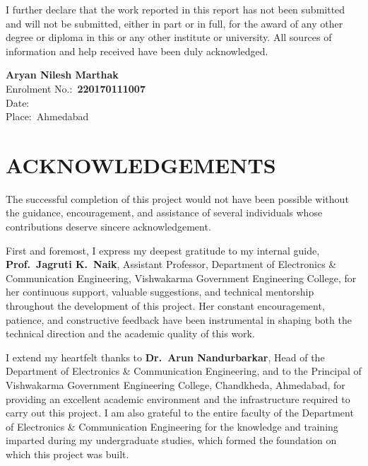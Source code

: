 \documentclass[12pt,a4paper,oneside]{report}
\begin{document}
I further declare that the work reported in this report has not been submitted
and will not be submitted, either in part or in full, for the award of any
other degree or diploma in this or any other institute or university.  All
sources of information and help received have been duly acknowledged.

\vspace{3cm}

\begin{flushright}
\textbf{Aryan Nilesh Marthak}\\
Enrolment No.:\ \textbf{220170111007}\\[8pt]
Date:\ \underline{\hspace{3.5cm}}\\[4pt]
Place:\ Ahmedabad
\end{flushright}

\chapter*{ACKNOWLEDGEMENTS}
\thispagestyle{romanplain}

The successful completion of this project would not have been possible without
the guidance, encouragement, and assistance of several individuals whose
contributions deserve sincere acknowledgement.

First and foremost, I express my deepest gratitude to my internal guide,
\textbf{Prof.\ Jagruti K.\ Naik}, Assistant Professor, Department of
Electronics \& Communication Engineering, Vishwakarma Government Engineering
College, for her continuous support, valuable suggestions, and technical
mentorship throughout the development of this project.  Her constant
encouragement, patience, and constructive feedback have been instrumental in
shaping both the technical direction and the academic quality of this work.

I extend my heartfelt thanks to \textbf{Dr.\ Arun Nandurbarkar}, Head of the
Department of Electronics \& Communication Engineering, and to the Principal
of Vishwakarma Government Engineering College, Chandkheda, Ahmedabad, for
providing an excellent academic environment and the infrastructure required to
carry out this project.  I am also grateful to the entire faculty of the
Department of Electronics \& Communication Engineering for the knowledge and
training imparted during my undergraduate studies, which formed the foundation
on which this project was built.
\end{document}
